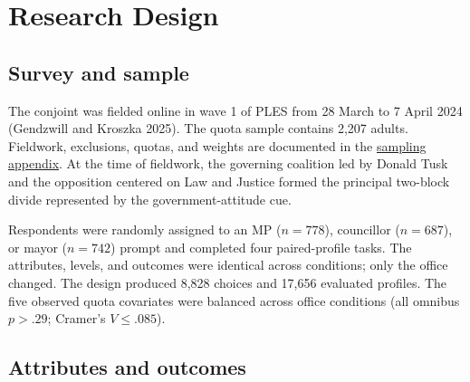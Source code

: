 \documentclass[
  letterpaper,
  DIV=11,
  numbers=noendperiod]{scrartcl}
\newcommand{\criticmarkuprm}[1]{}
\begin{document}
\criticmarkuprm{The primary comparison uses clearly aligned and
non-aligned candidate--respondent pairs. We expect aligned profiles to
outperform non-aligned profiles. If place and government alignment
reinforce each other, the local bonus should be larger among aligned
pairs; if they operate additively, the local bonus should not differ by
alignment. We therefore compare both conditional effects and their
difference-in-differences. Neutral profiles remain in the pooled
analysis because their general appeal is substantively important, but
they are outside this direct alignment test.}

\section{Research Design}\label{research-design}

\subsection{Survey and sample}\label{survey-and-sample}

The conjoint was fielded online in wave 1 of PLES from 28 March to 7
April 2024 (Gendzwill and Kroszka 2025). The quota sample contains 2,207
adults. Fieldwork, exclusions, quotas, and weights are documented in the
\hyperref[sec-sampling]{sampling appendix}. At the time of fieldwork,
the governing coalition led by Donald Tusk and the opposition centered
on Law and Justice formed the principal two-block divide represented by
the government-attitude cue.

Respondents were randomly assigned to an MP (\(n=778\)), councillor
(\(n=687\)), or mayor (\(n=742\)) prompt and completed four
paired-profile tasks. The attributes, levels, and outcomes were
identical across conditions; only the office changed. The design
produced 8,828 choices and 17,656 evaluated profiles. The five observed
quota covariates were balanced across office conditions (all omnibus
\(p>.29\); Cramer's \(V\le .085\)).

\subsection{Attributes and outcomes}\label{attributes-and-outcomes}
\end{document}
